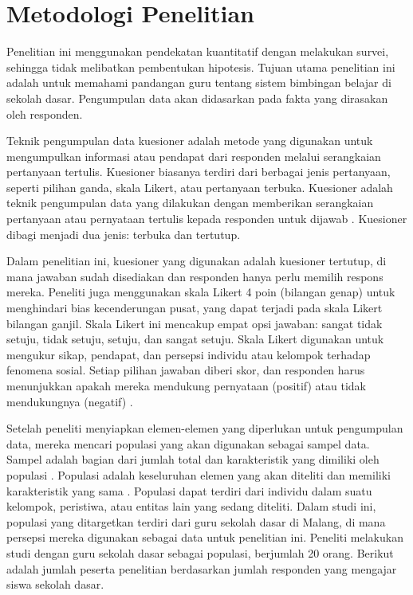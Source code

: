 \section{Metodologi Penelitian}

    Penelitian ini menggunakan pendekatan kuantitatif dengan melakukan survei, sehingga tidak melibatkan pembentukan hipotesis. Tujuan utama penelitian ini adalah untuk memahami pandangan guru tentang sistem bimbingan belajar di sekolah dasar. Pengumpulan data akan didasarkan pada fakta yang dirasakan oleh responden. 
    
    Teknik pengumpulan data kuesioner adalah metode yang digunakan untuk mengumpulkan informasi atau pendapat dari responden melalui serangkaian pertanyaan tertulis. Kuesioner biasanya terdiri dari berbagai jenis pertanyaan, seperti pilihan ganda, skala Likert, atau pertanyaan terbuka. Kuesioner adalah teknik pengumpulan data yang dilakukan dengan memberikan serangkaian pertanyaan atau pernyataan tertulis kepada responden untuk dijawab \citep{Schillaci2022}. Kuesioner dibagi menjadi dua jenis: terbuka dan tertutup.

    Dalam penelitian ini, kuesioner yang digunakan adalah kuesioner tertutup, di mana jawaban sudah disediakan dan responden hanya perlu memilih respons mereka. Peneliti juga menggunakan skala Likert 4 poin (bilangan genap) untuk menghindari bias kecenderungan pusat, yang dapat terjadi pada skala Likert bilangan ganjil. Skala Likert ini mencakup empat opsi jawaban: sangat tidak setuju, tidak setuju, setuju, dan sangat setuju. Skala Likert digunakan untuk mengukur sikap, pendapat, dan persepsi individu atau kelompok terhadap fenomena sosial. Setiap pilihan jawaban diberi skor, dan responden harus menunjukkan apakah mereka mendukung pernyataan (positif) atau tidak mendukungnya (negatif) \citep{Schillaci2022}.

    Setelah peneliti menyiapkan elemen-elemen yang diperlukan untuk pengumpulan data, mereka mencari populasi yang akan digunakan sebagai sampel data. Sampel adalah bagian dari jumlah total dan karakteristik yang dimiliki oleh populasi \citep{Turner2020}. Populasi adalah keseluruhan elemen yang akan diteliti dan memiliki karakteristik yang sama \citep{Norman2024}. Populasi dapat terdiri dari individu dalam suatu kelompok, peristiwa, atau entitas lain yang sedang diteliti. Dalam studi ini, populasi yang ditargetkan terdiri dari guru sekolah dasar di Malang, di mana persepsi mereka digunakan sebagai data untuk penelitian ini. Peneliti melakukan studi dengan guru sekolah dasar sebagai populasi, berjumlah 20 orang. Berikut adalah jumlah peserta penelitian berdasarkan jumlah responden yang mengajar siswa sekolah dasar.

